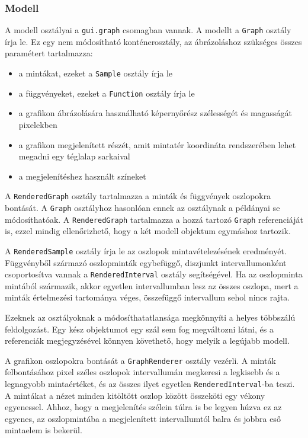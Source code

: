 \subsubsection{Modell}

A modell osztályai a \texttt{gui.graph} csomagban vannak.
A modellt a \texttt{Graph} osztály írja le.
Ez egy nem módosítható konténerosztály, az ábrázoláshoz szükséges összes paramétert tartalmazza:
\begin{itemize}
\item a mintákat, ezeket a \texttt{Sample} osztály írja le
\item a függvényeket, ezeket a \texttt{Function} osztály írja le
\item a grafikon ábrázolására használható képernyőrész szélességét és magasságát pixelekben
\item a grafikon megjelenített részét, amit mintatér koordináta rendszerében lehet megadni egy téglalap sarkaival
\item a megjelenítéshez használt színeket
\end{itemize}

A \texttt{RenderedGraph} osztály tartalmazza a minták és függvények oszlopokra bontását.
A \texttt{Graph} osztályhoz hasonlóan ennek az osztálynak a példányai se módosíthatóak.
A \texttt{RenderedGraph} tartalmazza a hozzá tartozó \texttt{Graph} referenciáját is, ezzel mindig ellenőrizhető, hogy a két modell objektum egymáshoz tartozik.

A \texttt{RenderedSample} osztály írja le az oszlopok mintavételezésének eredményét.
Függvényből származó oszlopminták egybefüggő, diszjunkt intervallumonként csoportosítva vannak a \texttt{RenderedInterval} osztály segítségével.
Ha az oszlopminta mintából származik, akkor egyetlen intervallumban lesz az összes oszlopa, mert a minták értelmezési tartománya véges, összefüggő intervallum sehol nincs rajta.

Ezeknek az osztályoknak a módosíthatatlansága megkönnyíti a helyes többszálú feldolgozást.
Egy kész objektumot egy szál sem fog megváltozni látni, és a referenciák megjegyzésével könnyen követhető, hogy melyik a legújabb modell.

A grafikon oszlopokra bontását a \texttt{GraphRenderer} osztály vezérli.
A minták felbontásához pixel széles oszlopok intervallumán megkeresi a legkisebb és a legnagyobb mintaértéket, és az összes ilyet egyetlen \texttt{RenderedInterval}-ba teszi.
A mintákat a nézet minden kitöltött oszlop között összeköti egy vékony egyenessel.
Ahhoz, hogy a megjelenítés szélein túlra is be legyen húzva ez az egyenes, az oszlopmintába a megjelenített intervallumtól balra és jobbra eső mintaelem is bekerül.

